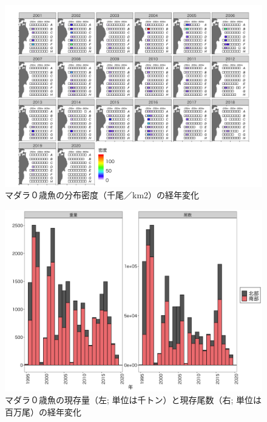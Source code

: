 \documentclass[11pt]{article} %
\begin{document}
\begin{linenumbers}
\begin{figure}[h]
  \centering
  \includegraphics[width = 14cm]{マダラ０＋dens.png}
  \caption{マダラ０歳魚の分布密度（千尾／km2）の経年変化}
\end{figure}

\begin{figure}[h]
  \centering
  \includegraphics[width = 14cm]{マダラ０＋trend.png}
  \caption{マダラ０歳魚の現存量（左; 単位は千トン）と現存尾数（右; 単位は百万尾）の経年変化}
\end{figure}


\end{linenumbers}
\end{document}
